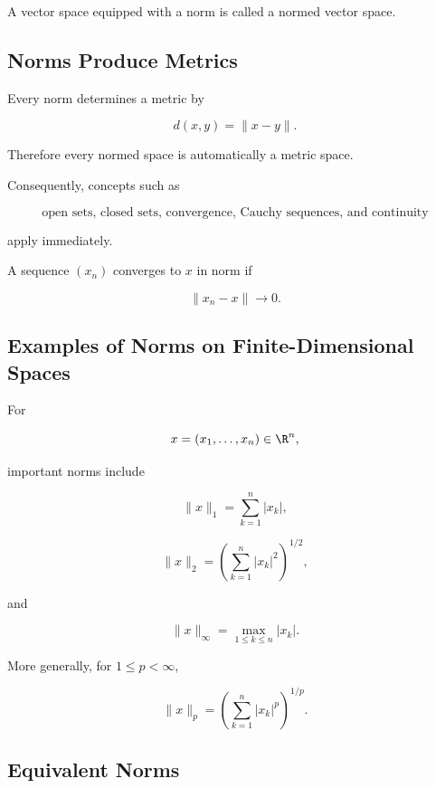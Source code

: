 A vector space equipped with a norm is called a normed vector space.

\subsection{Norms Produce Metrics}
\label{subsec:norms-produce-metrics}

Every norm determines a metric by

\[
\boxed{
d(x,y)=\|x-y\|.
}
\]

Therefore every normed space is automatically a metric space.

Consequently, concepts such as

\[
\boxed{
\text{open sets, closed sets, convergence, Cauchy sequences, and continuity}
}
\]

apply immediately.

A sequence \((x_n)\) converges to \(x\) in norm if

\[
\boxed{
\|x_n-x\|\to0.
}
\]

\subsection{Examples of Norms on Finite-Dimensional Spaces}
\label{subsec:finite-dimensional-norms}

For

\[
x=(x_1,\ldots,x_n)\in\R^n,
\]

important norms include

\[
\boxed{
\|x\|_1
=
\sum_{k=1}^{n}|x_k|,
}
\]

\[
\boxed{
\|x\|_2
=
\left(
\sum_{k=1}^{n}|x_k|^2
\right)^{1/2},
}
\]

and

\[
\boxed{
\|x\|_\infty
=
\max_{1\leq k\leq n}|x_k|.
}
\]

More generally, for \(1\leq p<\infty\),

\[
\boxed{
\|x\|_p
=
\left(
\sum_{k=1}^{n}|x_k|^p
\right)^{1/p}.
}
\]

\subsection{Equivalent Norms}
\label{subsec:equivalent-norms}

